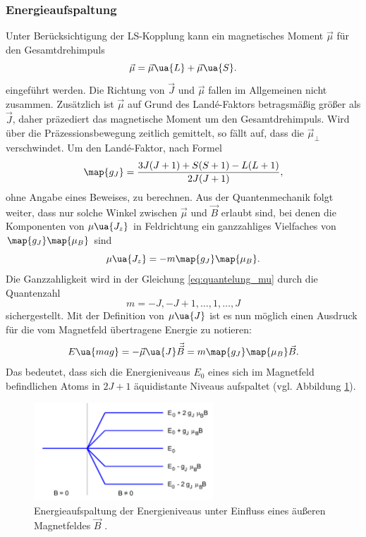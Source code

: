 \subsubsection{Energieaufspaltung}
Unter Berücksichtigung der LS-Kopplung kann ein magnetisches Moment $\vec{\mu}$ für den Gesamtdrehimpuls %
\begin{equation*}
  \vec{\mu}=\vec{\mu}\ua{L} + \vec{\mu}\ua{S}.
\end{equation*}
eingeführt werden.
Die Richtung von $\vec{J}$ und $\vec{\mu}$ fallen im Allgemeinen nicht zusammen. Zusätzlich ist
$\vec{\mu}$ auf Grund des Landé-Faktors betragsmäßig größer als $\vec{J}$, daher präzediert das magnetische Moment um den Gesamtdrehimpuls. %
Wird über die Präzessionsbewegung zeitlich gemittelt, so fällt auf, dass die $\vec{\mu}_{\perp}$ verschwindet. %
Um den Landé-Faktor, nach Formel %
\begin{equation}
  \label{eq:lande_faktor}
  \map{g_J}=\frac{3J(J+1)+S(S+1)-L(L+1)}{2J(J+1)},  %
\end{equation}
ohne Angabe eines Beweises, zu berechnen.
Aus der Quantenmechanik folgt weiter, dass nur solche Winkel zwischen $\vec{\mu}$ und %
$\vec{B}$ erlaubt sind, bei denen die Komponenten von $\mu\ua{J_z}$ in Feldrichtung ein ganzzahliges Vielfaches von
$\map{g_J}\map{\mu_B}$ sind
\begin{equation}
  \label{eq:quantelung_mu}
  \mu\ua{J_z}=-m\map{g_J}\map{\mu_B}.
\end{equation}
Die Ganzzahligkeit wird in der Gleichung \eqref{eq:quantelung_mu} durch die Quantenzahl
\begin{equation*}
m=-J,-J+1,\dots,1,\dots, J
\end{equation*}
sichergestellt.
Mit der Definition von $\mu\ua{J}$ ist es nun möglich einen Ausdruck für die vom Magnetfeld übertragene Energie
zu notieren:
\begin{equation}
  \label{eq:energie_mag}
  E\ua{mag}=-\vec{\mu}\ua{J}\vec{\vec{B}}=m\map{g_J}\map{\mu_B}\vec{B}.
\end{equation}
Das bedeutet, dass sich die Energieniveaus $E_0$ eines sich im Magnetfeld befindlichen Atoms
in $2J+1$ äquidistante Niveaus aufspaltet (vgl. Abbildung \ref{fig: energie_magnet}).
\FloatBarrier
\begin{figure}[h]
  \centering
  \includegraphics[width=0.6\textwidth]{pics/energieaufspaltung_magnetfeld.png}
  \caption{Energieaufspaltung der Energieniveaus unter Einfluss eines äußeren Magnetfeldes $\vec{B}$ \cite{anleitung27}.}
  \label{fig: energie_magnet}
\end{figure}
\FloatBarrier


